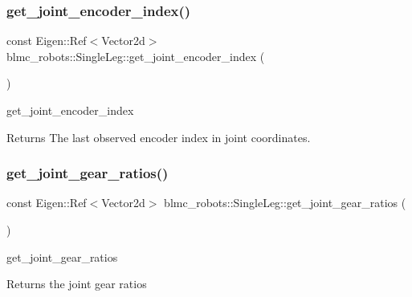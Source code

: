 \subsubsection{\texorpdfstring{get\+\_\+joint\+\_\+encoder\+\_\+index()}{get\_joint\_encoder\_index()}}
{\footnotesize\ttfamily const Eigen\+::\+Ref$<$Vector2d$>$ blmc\+\_\+robots\+::\+Single\+Leg\+::get\+\_\+joint\+\_\+encoder\+\_\+index (\begin{DoxyParamCaption}{ }\end{DoxyParamCaption})\hspace{0.3cm}{\ttfamily [inline]}}



get\+\_\+joint\+\_\+encoder\+\_\+index 

\begin{DoxyReturn}{Returns}
The last observed encoder index in joint coordinates. 
\end{DoxyReturn}
\mbox{\label{classblmc__robots_1_1SingleLeg_ac697752c8bd67dc1f58360dbe46e57a6}} 
\subsubsection{\texorpdfstring{get\+\_\+joint\+\_\+gear\+\_\+ratios()}{get\_joint\_gear\_ratios()}}
{\footnotesize\ttfamily const Eigen\+::\+Ref$<$Vector2d$>$ blmc\+\_\+robots\+::\+Single\+Leg\+::get\+\_\+joint\+\_\+gear\+\_\+ratios (\begin{DoxyParamCaption}{ }\end{DoxyParamCaption})\hspace{0.3cm}{\ttfamily [inline]}}



get\+\_\+joint\+\_\+gear\+\_\+ratios 

\begin{DoxyReturn}{Returns}
the joint gear ratios 
\end{DoxyReturn}
\mbox{\label{classblmc__robots_1_1SingleLeg_ad69364827ba1f041bb45aec9ff678a74}} 
